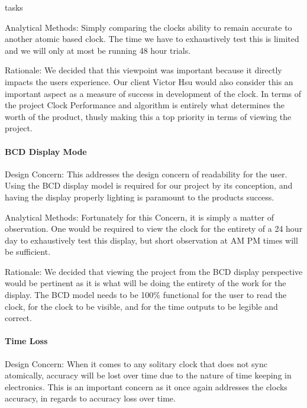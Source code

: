 tasks\documentclass[onecolumn, draftclsnofoot,10pt, compsoc]{IEEEtran}
\begin{document}
\vspace{2mm} Analytical Methods: Simply comparing the clocks ability to remain accurate to another atomic based clock.
The time we have to exhaustively test this is limited and we will only at most be running 48 hour trials.

\vspace{2mm} Rationale: We decided that this viewpoint was important because it directly impacts the users experience.
Our client Victor Hsu would also consider this an important aspect as a measure of success in development of the clock.
In terms of the project Clock Performance and algorithm is entirely what determines the worth of the product, thusly making this a top priority in terms of viewing the project.

\paragraph{BCD Display Mode}
\vspace{2mm} Design Concern: This addresses the design concern of readability for the user.
Using the BCD display model is required for our project by its conception, and having the display properly lighting is paramount to the products success.

\vspace{2mm} Analytical Methods: Fortunately for this Concern, it is simply a matter of observation.
One would be required to view the clock for the entirety of a 24 hour day to exhaustively test this display, but short observation at AM PM times will be sufficient.

\vspace{2mm} Rationale: We decided that viewing the project from the BCD display perspective would be pertinent as it is what will be doing the entirety of the work for the display.
The BCD model needs to be 100\% functional for the user to read the clock, for the clock to be visible, and for the time outputs to be legible and correct.

\paragraph{Time Loss}
\vspace{2mm} Design Concern: When it comes to any solitary clock that does not sync atomically, accuracy will be lost over time due to the nature of time keeping in electronics.
This is an important concern as it once again addresses the clocks accuracy, in regards to accuracy loss over time.
\end{document}
